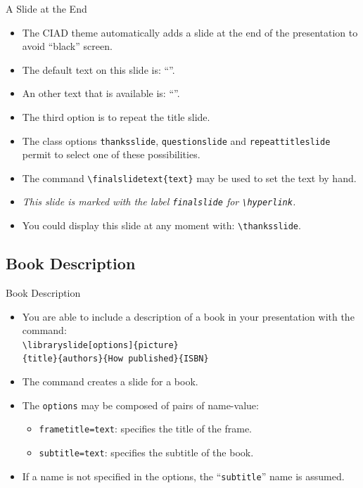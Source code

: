\documentclass[english,sectioncirclenumberstyle]{ciadbeamer}
\begin{document}
\begin{frame}{{A Slide} at the End}
	\begin{itemize}
	\item The CIAD theme automatically adds a slide at the end of the presentation to avoid ``black'' screen.
	\vfill
	\item The default text on this slide is: ``''.
	\item An other text that is available is: ``''.
	\item The third option is to repeat the title slide.
	\vfill
	\item The class options \texttt{thanksslide}, \texttt{questionslide} and \texttt{repeattitleslide} permit to select one of these possibilities.
	\vfill
	\item The command \texttt{{\textbackslash}finalslidetext\{text\}} may be used to set the text by hand.
	\vfill
	\item \emph{This slide is marked with the label \texttt{finalslide} for \texttt{{\textbackslash}hyperlink}.}
	\vfill
	\item You could display this slide at any moment with: \texttt{{\textbackslash}thanksslide}.
	\end{itemize}
\end{frame}

\subsection{Book Description}

\begin{frame}{Book Description}
	\begin{itemize}
	\item You are able to include a description of a book in your presentation with the command: \\
		\texttt{{\textbackslash}libraryslide[options]\{picture\}} \\
		\texttt{\{title\}\{authors\}\{How published\}\{ISBN\}}
	\vspace{1em}
	\item The command creates a slide for a book.
	\vspace{1em}
	\item The \texttt{options} may be composed of pairs of name-value:
		\begin{itemize}
		\item \texttt{frametitle=text}: specifies the title of the frame.
		\item \texttt{subtitle=text}: specifies the subtitle of the book.
		\end{itemize}
	\item If a name is not specified in the options, the ``\texttt{subtitle}'' name is assumed.
	\end{itemize}
\end{frame}
\end{document}
